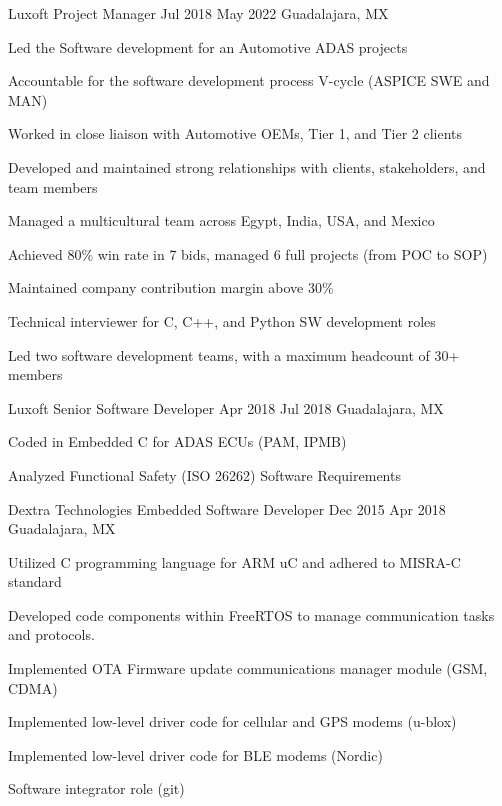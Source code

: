 \documentclass{resume} %
\begin{document}
\job
    {Luxoft}
    {Project Manager}
    {Jul 2018}
    {May 2022}
    {Guadalajara, MX}
    {
    \begin{itemize-bullets}
    \item{Led the Software development for an Automotive ADAS projects}
    \item{Accountable for the software development process V-cycle (ASPICE SWE and MAN)}
    \item{Worked in close liaison with Automotive OEMs, Tier 1, and Tier 2 clients}
    \item{Developed and maintained strong relationships with clients, stakeholders, and team members}
    \item{Managed a multicultural team across Egypt, India, USA, and Mexico}
    \item{Achieved 80\% win rate in 7 bids, managed 6 full projects (from POC to SOP)}
    \item{Maintained company contribution margin above 30\%}
    \item{Technical interviewer for C, C++, and Python SW development roles}
    \item{Led two software development teams, with a maximum headcount of 30+ members}
    \end{itemize-bullets}
    }


\job
    {Luxoft}
    {Senior Software Developer}
    {Apr 2018}
    {Jul 2018}
    {Guadalajara, MX}
    {
    \begin{itemize-bullets}
    \item{Coded in Embedded C for ADAS ECUs (PAM, IPMB)}
    \item{Analyzed Functional Safety (ISO 26262) Software Requirements}
    \end{itemize-bullets}
    }


\job
    {Dextra Technologies}
    {Embedded Software Developer}
    {Dec 2015}
    {Apr 2018}
    {Guadalajara, MX}
    {
    \begin{itemize-bullets}
    \item{Utilized C programming language for ARM uC and adhered to MISRA-C standard}
    \item{Developed code components within FreeRTOS to manage communication tasks and protocols.}
    \item{Implemented OTA Firmware update communications manager module (GSM, CDMA)}
    \item{Implemented low-level driver code for cellular and GPS modems (u-blox)}
    \item{Implemented low-level driver code for BLE modems (Nordic)}
    \item{Software integrator role (git)}
    \end{itemize-bullets}
    }
\end{document}
